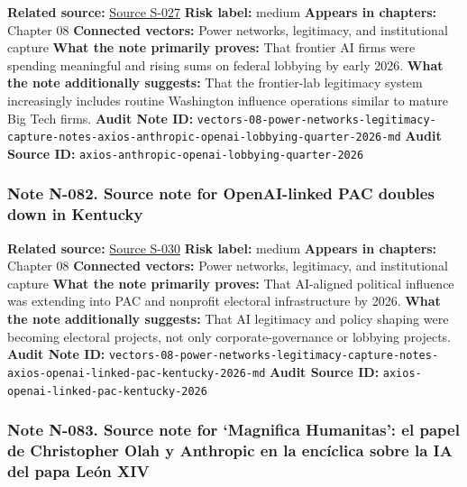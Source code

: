 \documentclass[
  american,
  11pt,
  letterpaper,
]{article}
\begin{document}
\textbf{Related source:}
\hyperref[source-s-027-anthropic-outspends-openai-in-biggest-ever-lobbying-quarter]{Source
S-027} \textbf{Risk label:} medium \textbf{Appears in chapters:} Chapter
08 \textbf{Connected vectors:} Power networks, legitimacy, and
institutional capture \textbf{What the note primarily proves:} That
frontier AI firms were spending meaningful and rising sums on federal
lobbying by early 2026. \textbf{What the note additionally suggests:}
That the frontier-lab legitimacy system increasingly includes routine
Washington influence operations similar to mature Big Tech firms.
\textbf{Audit Note ID:}
\texttt{vectors-08-power-networks-legitimacy-capture-notes-axios-anthropic-openai-lobbying-quarter-2026-md}
\textbf{Audit Source ID:}
\texttt{axios-anthropic-openai-lobbying-quarter-2026}

\subsubsection{Note N-082. Source note for OpenAI-linked PAC doubles
down in
Kentucky}\label{note-n-082-vectors-08-power-networks-legitimacy-capture-notes-axios-openai-linked-pac-kentucky-2026-md}

\textbf{Related source:}
\hyperref[source-s-030-openai-linked-pac-doubles-down-in-kentucky]{Source
S-030} \textbf{Risk label:} medium \textbf{Appears in chapters:} Chapter
08 \textbf{Connected vectors:} Power networks, legitimacy, and
institutional capture \textbf{What the note primarily proves:} That
AI-aligned political influence was extending into PAC and nonprofit
electoral infrastructure by 2026. \textbf{What the note additionally
suggests:} That AI legitimacy and policy shaping were becoming electoral
projects, not only corporate-governance or lobbying projects.
\textbf{Audit Note ID:}
\texttt{vectors-08-power-networks-legitimacy-capture-notes-axios-openai-linked-pac-kentucky-2026-md}
\textbf{Audit Source ID:} \texttt{axios-openai-linked-pac-kentucky-2026}

\subsubsection{Note N-083. Source note for `Magnifica Humanitas': el
papel de Christopher Olah y Anthropic en la encíclica sobre la IA del
papa León
XIV}\label{note-n-083-vectors-08-power-networks-legitimacy-capture-notes-conversation-magnifica-humanitas-olah-anthropic-2026-md}
\end{document}
